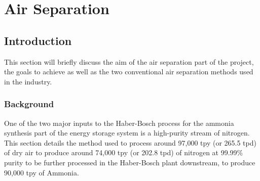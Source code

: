 %

\section{Air Separation}

\subsection{Introduction} \noindent
This section will briefly discuss the aim of the air separation part of the project, the goals to achieve as well as the two conventional air separation methods used in the industry.
	\subsubsection{Background}  \noindent
    One of the two major inputs to the Haber-Bosch process for the ammonia synthesis part of the energy storage system is a high-purity stream of nitrogen. This section details the method used to process around 97,000 tpy (or 265.5 tpd) of dry air to produce around 74,000 tpy (or 202.8 tpd) of nitrogen at 99.99\% purity to be further processed in the Haber-Bosch plant downstream, to produce 90,000 tpy of Ammonia.
